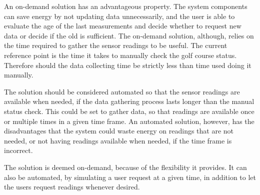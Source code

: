 \iffalse
\begin{enumerate}
	\item The system user will use an interface to demand readings from the sensors in the network.
	\item The main node responds to the demand by sending a request packet in the network.
	\item The nodes receiving the signal gathers data from its sensors and sends it back to its parent.
	\item When the sent packet is acknowledged, the node retransmits the recently received request signal and awaits data.
	\item Step 3 and 4 is repeated throughout the network, so that every node within reach of the network will transmit or relay data to its parent.
	\item The main node collects all data and append each reading to the respective node in a data sheet available to the user.
\end{enumerate}
\fi

An on-demand solution has an advantageous property. The system components can save energy by not updating data unnecessarily, and the user is able to evaluate the age of the last measurements and decide whether to request new data or decide if the old is sufficient. The on-demand solution, although, relies on the time required to gather the sensor readings to be useful. The current reference point is the time it takes to manually check the golf course status. Therefore should the data collecting time be strictly less than time used doing it manually.

The solution should be considered automated so that the sensor readings are available when needed, if the data gathering process lasts longer than the manual status check. This could be set to gather data, so that readings are available once or multiple times in a given time frame. An automated solution, however, has the disadvantages that the system could waste energy on readings that are not needed, or not having readings available when needed, if the time frame is incorrect.

The solution is deemed on-demand, because of the flexibility it provides. It can also be automated, by simulating a user request at a given time, in addition to let the users request readings whenever desired.


